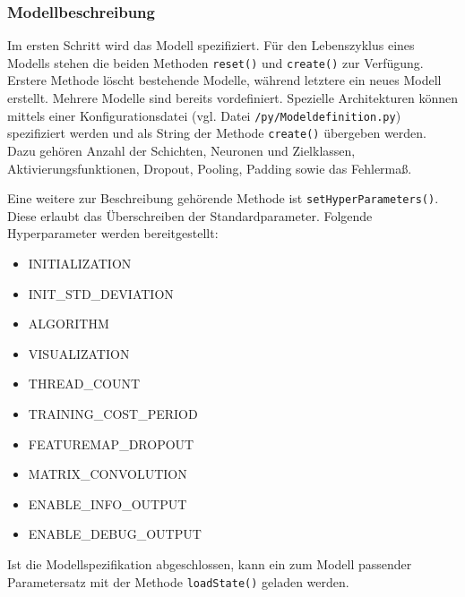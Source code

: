 \subsubsection{Modellbeschreibung}
Im ersten Schritt wird das Modell spezifiziert. Für den Lebenszyklus eines Modells stehen die beiden Methoden \texttt{reset()} und \texttt{create()} zur Verfügung. Erstere Methode löscht bestehende Modelle, während letztere ein neues Modell erstellt.
Mehrere Modelle sind bereits vordefiniert. Spezielle Architekturen können mittels einer Konfigurationsdatei (vgl. Datei \texttt{/py\-/Model\-definition.py}) spezifiziert werden und als String der Methode \texttt{create()} übergeben werden. Dazu gehören Anzahl der Schichten, Neuronen und Zielklassen, Aktivierungsfunktionen, Dropout, Pooling, Padding sowie das Fehlermaß.

Eine weitere zur Beschreibung gehörende Methode ist \texttt{setHyperParameters()}. Diese erlaubt das Überschreiben der Standardparameter. Folgende  Hyperparameter werden bereitgestellt:

\begin{multicols}{2}
\begin{itemize}
\item INITIALIZATION
\item INIT\_STD\_DEVIATION
\item ALGORITHM
\item VISUALIZATION
\item THREAD\_COUNT
\item TRAINING\_COST\_PERIOD
\item FEATUREMAP\_DROPOUT
\item MATRIX\_CONVOLUTION
\item ENABLE\_INFO\_OUTPUT
\item ENABLE\_DEBUG\_OUTPUT 
\end{itemize}
\end{multicols}


Ist die Modellspezifikation abgeschlossen, kann ein zum Modell passender Parametersatz mit der Methode \texttt{loadState()} geladen werden.

